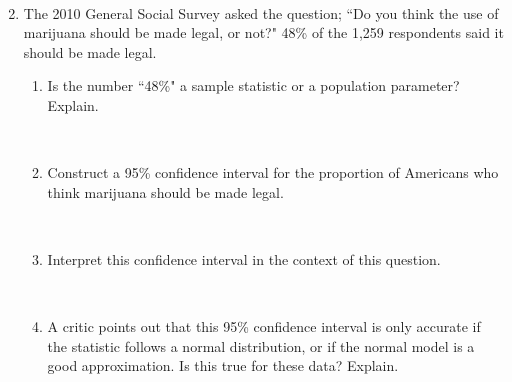 \documentclass[11pt]{article}
\newcommand{\soln}[2]{$\:$\\ \vspace{#1}}{}
\begin{document}
\begin{enumerate}
\begin{enumerate}
\soln{2cm}{Reject $H_0$. The data provide convincing evidence that the political ideology and the degree to which Florida 
residents think the victim's race was a major factor in this shooting are associated.}

\end{enumerate}


\pagebreak

\item The 2010 General Social Survey asked the question; ``Do you think the use of marijuana should be made legal, 
or not?" 48\% of the 1,259 respondents said it should be made legal.

\begin{enumerate}

\item Is the number ``48\%" a sample statistic or a population parameter? Explain.

\soln{1cm}{Sample statistic, it's the observed proportion.}

\item Construct a 95\% confidence interval for the proportion of Americans who think marijuana should be made legal.

\soln{4cm}{
\begin{align*}
\hat{p} &= 0.48 \\
0.48 &\pm 1.96 \sqrt{ \frac{0.48 * (1 - 0.48)}{1259} } \\
0.48 &\pm 1.96 * 0.014 \\
0.48 &\pm 0.0274 \\
(0.4526 &, 0.5074)
\end{align*}
}
\item Interpret this confidence interval in the context of this question.

\soln{3cm}{We are 95\% confident that roughly 45.26\% to 50.74\% of Americans think marijuana should be legalized.}

\item A critic points out that this 95\% confidence interval is only accurate if the statistic follows a normal 
distribution, or if the normal model is a good approximation. Is this true for these data? Explain.

\soln{4cm}{The number of successes (people who said marijuana should be legalized: $1259 * 0.48 = 604.32$) and 
failures (people who said it shouldn't be: $1259 * 0.52 = 654.68$) are both greater than 10, therefore the distribution 
of the statistic is expected to be nearly normal.}


\end{enumerate}
\end{enumerate}
\end{document}
